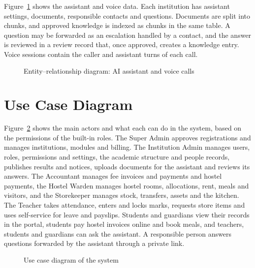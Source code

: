 Figure~\ref{fig:erd-assistant} shows the assistant and voice data. Each institution has assistant settings, documents, responsible contacts and questions. Documents are split into chunks, and approved knowledge is indexed as chunks in the same table. A question may be forwarded as an escalation handled by a contact, and the answer is reviewed in a review record that, once approved, creates a knowledge entry. Voice sessions contain the caller and assistant turns of each call.

{
  \begin{figure}[!htbp]
    \centering
    \caption{Entity--relationship diagram: AI assistant and voice calls}
    \label{fig:erd-assistant}
  \end{figure}
}

\section{Use Case Diagram}
Figure~\ref{fig:usecase} shows the main actors and what each can do in the system, based on the permissions of the built-in roles. The Super Admin approves registrations and manages institutions, modules and billing. The Institution Admin manages users, roles, permissions and settings, the academic structure and people records, publishes results and notices, uploads documents for the assistant and reviews its answers. The Accountant manages fee invoices and payments and hostel payments, the Hostel Warden manages hostel rooms, allocations, rent, meals and visitors, and the Storekeeper manages stock, transfers, assets and the kitchen. The Teacher takes attendance, enters and locks marks, requests store items and uses self-service for leave and payslips. Students and guardians view their records in the portal, students pay hostel invoices online and book meals, and teachers, students and guardians can ask the assistant. A responsible person answers questions forwarded by the assistant through a private link.

{
  \begin{figure}[!htbp]
    \centering
    \caption{Use case diagram of the system}
    \label{fig:usecase}
  \end{figure}
}

